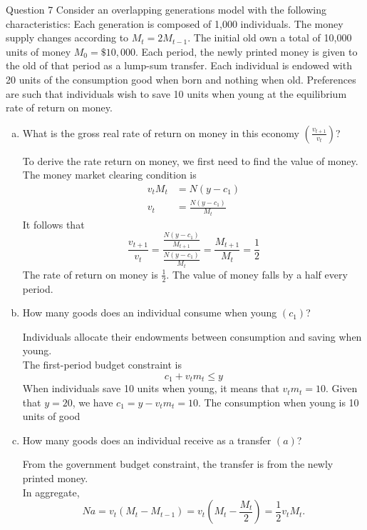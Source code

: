 \documentclass[a4paper]{article}
\newif\IfInSansMode
\numberwithin{equation}{section}
\numberwithin{figure}{section}
\begin{document}
	\begin{questionbox}{Question 7}
		Consider an overlapping generations model with the following characteristics: Each generation is composed of 1,000 individuals. The money supply changes according to \( M_t = 2M_{t-1} \). The initial old own a total of 10,000 units of money \( M_0 = \$10,000 \). Each period, the newly printed money is given to the old of that period as a lump-sum transfer. Each individual is endowed with 20 units of the consumption good when born and nothing when old. Preferences are such that individuals wish to save 10 units when young at the equilibrium rate of return on money.
		\begin{enumerate}[(a)]
			\item What is the gross real rate of return on money in this economy \( (\frac{v_{t+1}}{v_t}) \)?
			\begin{explanationbox}
				To derive the rate return on money, we first need to find the value of money. The money market clearing condition is
				\begin{align*}
					v_tM_t &= N(y-c_1)\\
					v_t &= \frac{N(y-c_1)}{M_t}
				\end{align*}
				It follows that
				\[
					\frac{v_{t+1}}{v_t} = \frac{\frac{N(y-c_1)}{M_{t+1}}}{\frac{N(y-c_1)}{M_t}} = \frac{M_{t+1}}{M_t} = \frac{1}{2}
				\]
				The rate of return on money is \( \frac{1}{2} \). The value of money falls by a half every period.
			\end{explanationbox}
			\item How many goods does an individual consume when young \( (c_1) \)?
			\begin{explanationbox}
				Individuals allocate their endowments between consumption and saving when young.\\
				The first-period budget constraint is
				\[
					c_1 + v_tm_t \leq y
				\]
				When individuals save 10 units when young, it means that \( v_tm_t = 10 \). Given that \( y=20 \), we have \( c_1 = y-v_tm_t = 10 \). The consumption when young is 10 units of good
			\end{explanationbox}
			\item How many goods does an individual receive as a transfer \( (a) \)?
			\begin{explanationbox}
				From the government budget constraint, the transfer is from the newly printed money.\\
				In aggregate,
				\[
					Na = v_t(M_t-M_{t-1}) = v_t \left( M_t-\frac{M_t}{2} \right) = \frac{1}{2} v_tM_t.
\]
\end{explanationbox}
\end{enumerate}
\end{questionbox}
\end{document}
